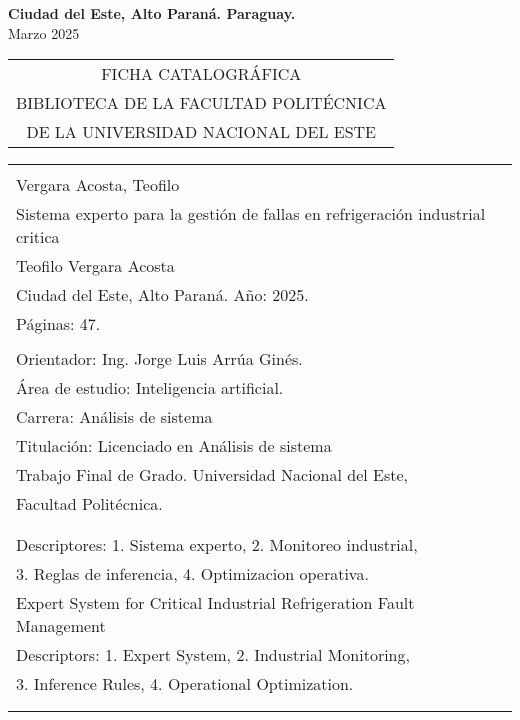 \vspace{4.0cm}
\begin{center}
{\large {\bf Ciudad del Este, Alto Paraná. Paraguay.}\\[6mm]
Marzo 2025}
\end{center}
\newpage \normalsize
\thispagestyle{empty}
\begin{center} 
\begin{tabular}{c} 
  FICHA CATALOGRÁFICA \\
  BIBLIOTECA DE LA FACULTAD POLITÉCNICA \\
  DE LA UNIVERSIDAD NACIONAL DEL ESTE \\
\end{tabular} %
\vspace{0.3cm}

\begin{tabular}{|l|} \hline %
\\
Vergara Acosta, Teofilo \\

Sistema experto para la gestión de fallas en refrigeración industrial critica \\
Teofilo Vergara Acosta\\
Ciudad del Este, Alto Paraná. Año: 2025.\\
Páginas: 47.\\ 
\\
Orientador: Ing. Jorge Luis Arrúa Ginés. \\

Área de estudio: Inteligencia artificial. \\
Carrera: Análisis de sistema \\
Titulación: Licenciado en Análisis de sistema \\

Trabajo Final de Grado. Universidad Nacional del Este, \\
Facultad Politécnica.\\
\\ \\

Descriptores: 1. Sistema experto, 2. Monitoreo industrial, \\
3. Reglas de inferencia, 4. Optimizacion operativa. \\

Expert System for Critical Industrial Refrigeration Fault Management \\
Descriptors: 1. Expert System, 2. Industrial Monitoring, \\
3. Inference Rules, 4. Operational Optimization. \\
\hspace{2cm} \\
\\
\hline
\end{tabular}
\end{center}

\tableofcontents
